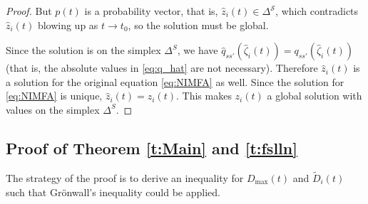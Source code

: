 \documentclass{article}
\newcommand{\1}[1]{{\mathds{1}}_{\left\{#1\right\}}}
\renewcommand{\S}{\mathcal{S}}
\newcommand{\remm}[1]{{#1}}
\begin{document}
\begin{proof}
		But $p(t)$ is a probability vector, that is, $\hat{z}_{i}(t) \in \Delta^{\S}$, which contradicts $\hat{z}_{i}(t)$ blowing up as $t\to t_0$, so the solution must be global.
		
		Since the solution is on the simplex $\Delta^{S}$, we have $\hat{q}_{ss'}\left(\hat{\zeta}_i(t) \right)=q_{ss'}\left(\hat{\zeta}_i(t) \right)$ (that is, the absolute values in \eqref{eq:q_hat} are not necessary). Therefore $\hat{z}_i(t)$ is a solution for the original equation \eqref{eq:NIMFA} as well. Since the solution for \eqref{eq:NIMFA} is unique, $\hat{z}_{i}(t)=z_{i}(t).$ This makes $z_i(t)$ a global solution with values on the simplex $\Delta^{S}.$  
	\end{proof}
	
	\subsection{Proof of Theorem \ref{t:Main} \remm{ and \ref{t:fslln}}}
	
	The strategy of the proof is to derive an inequality for $D_{\max}(t)$ and $\tilde{D}_{i}(t)$ such that Grönwall's inequality could be applied.
	
\end{document}
